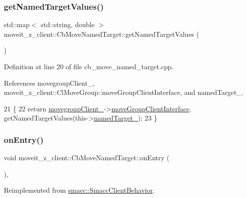 \subsubsection{\texorpdfstring{get\+Named\+Target\+Values()}{getNamedTargetValues()}}
{\footnotesize\ttfamily std\+::map$<$ std\+::string, double $>$ moveit\+\_\+z\+\_\+client\+::\+Cb\+Move\+Named\+Target\+::get\+Named\+Target\+Values (\begin{DoxyParamCaption}{ }\end{DoxyParamCaption})}



Definition at line 20 of file cb\+\_\+move\+\_\+named\+\_\+target.\+cpp.



References movegroup\+Client\+\_\+, moveit\+\_\+z\+\_\+client\+::\+Cl\+Move\+Group\+::move\+Group\+Client\+Interface, and named\+Target\+\_\+.


\begin{DoxyCode}
21 \{
22     \textcolor{keywordflow}{return} \hyperlink{classmoveit__z__client_1_1CbMoveNamedTarget_a1caf87b542890eb9181b04dc2271ef65}{movegroupClient\_}->\hyperlink{classmoveit__z__client_1_1ClMoveGroup_af86e046b837be0ef4afa9893d8808f20}{moveGroupClientInterface}.
      getNamedTargetValues(this->\hyperlink{classmoveit__z__client_1_1CbMoveNamedTarget_a84a8aadc460b4a68eae22d25479c2bce}{namedTarget\_});
23 \}
\end{DoxyCode}
\mbox{\label{classmoveit__z__client_1_1CbMoveNamedTarget_ad84bcf4ea514c0cdc3550ca41ff77d69}} 
\subsubsection{\texorpdfstring{on\+Entry()}{onEntry()}}
{\footnotesize\ttfamily void moveit\+\_\+z\+\_\+client\+::\+Cb\+Move\+Named\+Target\+::on\+Entry (\begin{DoxyParamCaption}{ }\end{DoxyParamCaption})\hspace{0.3cm}{\ttfamily [override]}, {\ttfamily [virtual]}}



Reimplemented from \hyperlink{classsmacc_1_1SmaccClientBehavior_a7962382f93987c720ad432fef55b123f}{smacc\+::\+Smacc\+Client\+Behavior}.



